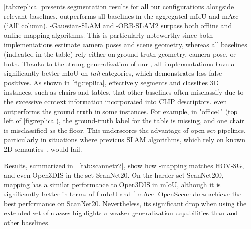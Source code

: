  \cref{tab:replica} presents segmentation results for all our \ours configurations alongside relevant baselines. \ours outperforms all baselines in the aggregated mIoU and mAcc (`All' column).
\ours-Gaussian-SLAM and \ours-ORB-SLAM2 surpass both offline and online mapping algorithms.
This is particularly noteworthy since both implementations estimate camera poses and scene geometry, whereas all baselines (indicated in the table) rely either on ground-truth geometry, camera pose, or both.  
Thanks to the strong generalization of our \clipours, all \ours implementations have a significantly better mIoU on \emph{tail} categories, which demonstrates less false-positives.
%
As shown in \cref{fig:replica}, \ours effectively segments and classifies 3D instances, such as chairs and tables, that other baselines often misclassify due to the excessive context information incorporated into CLIP descriptors.
\ours even outperforms the ground truth in some instances.
For example, in "office4" (top left of \cref{fig:replica}), the ground-truth label for the table is missing, and one chair is misclassified as the floor.
This underscores the advantage of open-set pipelines, particularly in situations where previous SLAM algorithms, which rely on known 2D semantics~\cite{li2024sgs, zhai2024nis}, would fail.

 Results, summarized in ~\cref{tab:scannetv2}, show how \ours-mapping matches HOV-SG, and even Open3DIS in the set ScanNet20.
On the harder set ScanNet200, \ours-mapping has a similar performance to Open3DIS in mIoU, although it is significantly better in terms of f-mIoU and f-mAcc.
OpenScene does achieve the best performance on ScanNet20. 
Nevertheless, its significant drop when using the extended set of classes highlights a weaker generalization capabilities than \ours and other baselines.

